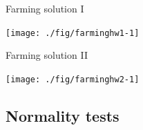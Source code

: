\documentclass[xcolor=table,           xcolor=dvipsnames]{beamer}\usepackage[]{graphicx}\usepackage[]{color}
\newenvironment{knitrout}{}{} %
\begin{document}
\begin{frame}{Farming solution I}
\begin{knitrout}
\color{fgcolor}

{\centering \texttt{[image: ./fig/farminghw1-1]} 

}



\end{knitrout}
\end{frame}


\begin{frame}{Farming solution II}
\begin{knitrout}
\color{fgcolor}

{\centering \texttt{[image: ./fig/farminghw2-1]} 

}



\end{knitrout}
\end{frame}


\subsection{Normality tests}
\end{document}

